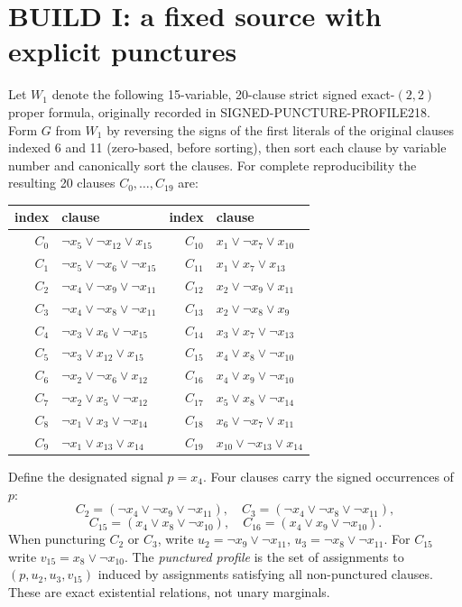 \documentclass[11pt]{article}
\begin{document}
\section{BUILD I: a fixed source with explicit punctures}
Let $W_1$ denote the following 15-variable, 20-clause strict signed exact-$(2,2)$ proper formula, originally recorded in SIGNED-PUNCTURE-PROFILE218. Form $G$ from $W_1$ by reversing the signs of the first literals of the original clauses indexed 6 and 11 (zero-based, before sorting), then sort each clause by variable number and canonically sort the clauses. For complete reproducibility the resulting 20 clauses $C_0,\ldots,C_{19}$ are:

\begin{center}\small\begin{tabular}{r l r l}\toprule
index&clause&index&clause\\\midrule
$C_{0}$ & $\neg x_{5}\vee \neg x_{12}\vee x_{15}$ & $C_{10}$ & $x_{1}\vee \neg x_{7}\vee x_{10}$\\
$C_{1}$ & $\neg x_{5}\vee \neg x_{6}\vee \neg x_{15}$ & $C_{11}$ & $x_{1}\vee x_{7}\vee x_{13}$\\
$C_{2}$ & $\neg x_{4}\vee \neg x_{9}\vee \neg x_{11}$ & $C_{12}$ & $x_{2}\vee \neg x_{9}\vee x_{11}$\\
$C_{3}$ & $\neg x_{4}\vee \neg x_{8}\vee \neg x_{11}$ & $C_{13}$ & $x_{2}\vee \neg x_{8}\vee x_{9}$\\
$C_{4}$ & $\neg x_{3}\vee x_{6}\vee \neg x_{15}$ & $C_{14}$ & $x_{3}\vee x_{7}\vee \neg x_{13}$\\
$C_{5}$ & $\neg x_{3}\vee x_{12}\vee x_{15}$ & $C_{15}$ & $x_{4}\vee x_{8}\vee \neg x_{10}$\\
$C_{6}$ & $\neg x_{2}\vee \neg x_{6}\vee x_{12}$ & $C_{16}$ & $x_{4}\vee x_{9}\vee \neg x_{10}$\\
$C_{7}$ & $\neg x_{2}\vee x_{5}\vee \neg x_{12}$ & $C_{17}$ & $x_{5}\vee x_{8}\vee \neg x_{14}$\\
$C_{8}$ & $\neg x_{1}\vee x_{3}\vee \neg x_{14}$ & $C_{18}$ & $x_{6}\vee \neg x_{7}\vee x_{11}$\\
$C_{9}$ & $\neg x_{1}\vee x_{13}\vee x_{14}$ & $C_{19}$ & $x_{10}\vee \neg x_{13}\vee x_{14}$\\
\bottomrule\end{tabular}\end{center}

Define the designated signal $p=x_4$. Four clauses carry the signed occurrences of $p$:
\[
 C_2=(\neg x_4\vee\neg x_9\vee\neg x_{11}),\quad
 C_3=(\neg x_4\vee\neg x_8\vee\neg x_{11}),
\]
\[
 C_{15}=(x_4\vee x_8\vee\neg x_{10}),\quad
 C_{16}=(x_4\vee x_9\vee\neg x_{10}).
\]
When puncturing $C_2$ or $C_3$, write $u_2=\neg x_9\lor\neg x_{11}$, $u_3=\neg x_8\lor\neg x_{11}$. For $C_{15}$ write $v_{15}=x_8\lor\neg x_{10}$. The \emph{punctured profile} is the set of assignments to $(p,u_2,u_3,v_{15})$ induced by assignments satisfying all non-punctured clauses. These are exact existential relations, not unary marginals.
\end{document}
